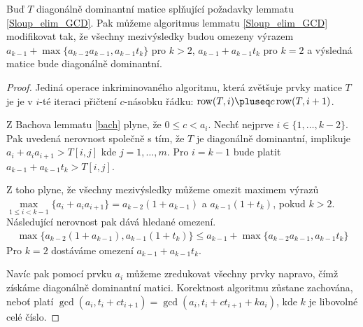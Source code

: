 \begin{lem} \label{Sloup_elim_GCD_modified}
Buď $ T $ diagonálně dominantní matice splňující požadavky lemmatu \ref{Sloup_elim_GCD}.
Pak můžeme algoritmus lemmatu \ref{Sloup_elim_GCD} modifikovat tak, že všechny
mezivýsledky budou omezeny výrazem 
$ a_{k - 1} + \max \{ a_{k - 2} a_{k - 1}, a_{k - 1} t_k \} $ pro $ k > 2 $,
$ a_{k - 1} + a_{k - 1} t_k $ pro $ k = 2 $
a výsledná matice bude diagonálně dominantní.
\end{lem}
\begin{proof}
Jediná operace inkriminovaného algoritmu, která zvětšuje prvky matice $ T $ je
je v $ i $-té iteraci přičtení $ c $-násobku řádku: 
$ \operatorname{row}(T, i) \pluseq c \operatorname{row}(T, i + 1) $.

Z Bachova lemmatu \ref{bach} plyne, že $ 0 \leq c < a_i $. 
Nechť nejprve $ i \in \{1, \dots, k - 2 \} $. Pak uvedená nerovnost společně s
tím, že $ T $ je diagonálně dominantní, implikuje $ a_i + a_i a_{i+1} > T[i, j] $ kde
$ j = 1, \dots, m $. Pro $ i = k - 1 $ bude platit $ a_{k-1} + a_{k - 1} t_k > T[i, j] $.

Z toho plyne, že všechny mezivýsledky můžeme omezit maximem výrazů
$ \max\limits_{1 \leq i < k - 1}\{ a_i + a_i a_{i+1} \} = a_{k - 2} ( 1 + a_{k - 1} )$ 
a $ a_{k - 1} ( 1 + t_k )$, pokud $ k > 2 $. Následující nerovnost pak dává 
hledané omezení.
\begin{align*}
    \max \{ a_{k - 2} ( 1 + a_{k - 1}),  a_{k - 1} ( 1 + t_k ) \} 
        \leq  a_{k - 1} + \max \{ a_{k - 2} a_{k - 1}, a_{k - 1} t_k \}
\end{align*}
Pro $ k = 2 $ dostáváme omezení $ a_{k - 1} + a_{k - 1} t_k $.

Navíc pak pomocí prvku
$ a_i $ můžeme zredukovat všechny prvky napravo, čímž získáme diagonálně dominantní
matici. Korektnost algoritmu zůstane zachována, neboť platí
$ \gcd(a_i, t_{i} + ct_{i+1}) = \gcd(a_i, t_{i} + ct_{i+1} + k a_i) $,
kde $ k $ je libovolné celé číslo.
\end{proof}




